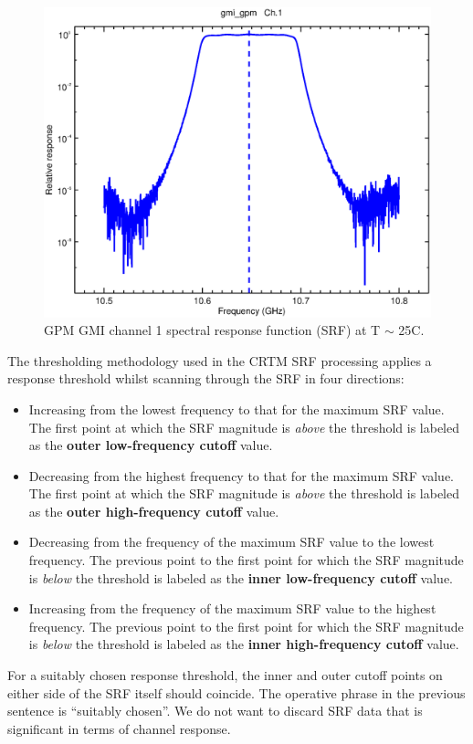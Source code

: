 \begin{figure}[H]
  \centering
  \includegraphics[scale=0.8]{graphics/gmi_gpm.no_threshold.channel1.eps}
  \caption{GPM GMI channel 1 spectral response function (SRF) at T $\sim$ 25C.}
  \label{fig:gmi_gpm.no_threshold.channel1}
\end{figure}

The thresholding methodology used in the CRTM SRF processing applies a response threshold whilst scanning through the SRF in four directions:
\begin{itemize}
  \item Increasing from the lowest frequency to that for the maximum SRF value. The first point at which the SRF magnitude is \emph{above} the threshold is labeled as the \textbf{outer low-frequency cutoff} value.
  \item Decreasing from the highest frequency to that for the maximum SRF value. The first point at which the SRF magnitude is \emph{above} the threshold is labeled as the \textbf{outer high-frequency cutoff} value.
  \item Decreasing from the frequency of the maximum SRF value to the lowest frequency. The previous point to the first point for which the SRF magnitude is \emph{below} the threshold is labeled as the \textbf{inner low-frequency cutoff} value.
  \item Increasing from the frequency of the maximum SRF value to the highest frequency. The previous point to the first point for which the SRF magnitude is \emph{below} the threshold is labeled as the \textbf{inner high-frequency cutoff} value.
\end{itemize}
For a suitably chosen response threshold, the inner and outer cutoff points on either side of the SRF itself should coincide. The operative phrase in the previous sentence is ``suitably chosen''. We do not want to discard SRF data that is significant in terms of channel response.

